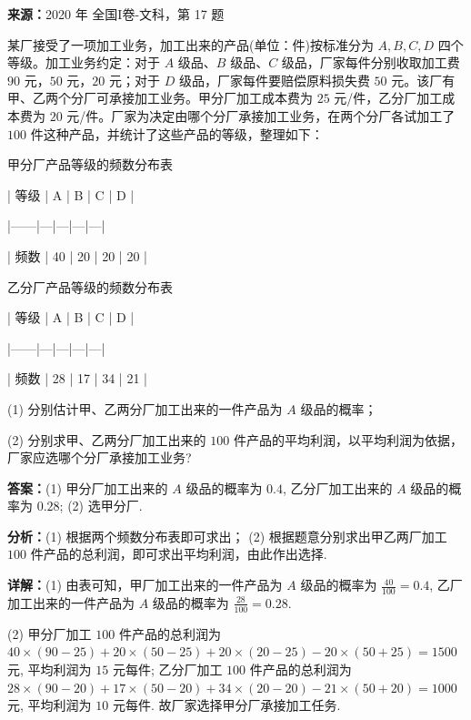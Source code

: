 \begin{question}[points=12]
\textbf{来源：}2020 年 全国I卷-文科，第 17 题\par
某厂接受了一项加工业务，加工出来的产品(单位：件)按标准分为 $A, B, C, D$ 四个等级。加工业务约定：对于 $A$ 级品、$B$ 级品、$C$ 级品，厂家每件分别收取加工费 $90$ 元，$50$ 元，$20$ 元；对于 $D$ 级品，厂家每件要赔偿原料损失费 $50$ 元。该厂有甲、乙两个分厂可承接加工业务。甲分厂加工成本费为 $25$ 元/件，乙分厂加工成本费为 $20$ 元/件。厂家为决定由哪个分厂承接加工业务，在两个分厂各试加工了 $100$ 件这种产品，并统计了这些产品的等级，整理如下：



甲分厂产品等级的频数分布表



| 等级 | A | B | C | D |

|------|---|---|---|---|

| 频数 | 40 | 20 | 20 | 20 |



乙分厂产品等级的频数分布表



| 等级 | A | B | C | D |

|------|---|---|---|---|

| 频数 | 28 | 17 | 34 | 21 |



(1) 分别估计甲、乙两分厂加工出来的一件产品为 $A$ 级品的概率；



(2) 分别求甲、乙两分厂加工出来的 $100$ 件产品的平均利润，以平均利润为依据，厂家应选哪个分厂承接加工业务?
\begin{solution}
\textbf{答案：}(1) 甲分厂加工出来的 $A$ 级品的概率为 $0.4$, 乙分厂加工出来的 $A$ 级品的概率为 $0.28$; (2) 选甲分厂.

\textbf{分析：}(1) 根据两个频数分布表即可求出； (2) 根据题意分别求出甲乙两厂加工 $100$ 件产品的总利润，即可求出平均利润，由此作出选择.

\textbf{详解：}(1) 由表可知，甲厂加工出来的一件产品为 $A$ 级品的概率为 $\frac{40}{100}=0.4$, 乙厂加工出来的一件产品为 $A$ 级品的概率为 $\frac{28}{100}=0.28$.

(2) 甲分厂加工 $100$ 件产品的总利润为 $40\times(90-25)+20\times(50-25)+20\times(20-25)-20\times(50+25)=1500$ 元, 平均利润为 $15$ 元每件; 乙分厂加工 $100$ 件产品的总利润为 $28\times(90-20)+17\times(50-20)+34\times(20-20)-21\times(50+20)=1000$ 元, 平均利润为 $10$ 元每件. 故厂家选择甲分厂承接加工任务.
\end{solution}
\end{question}

